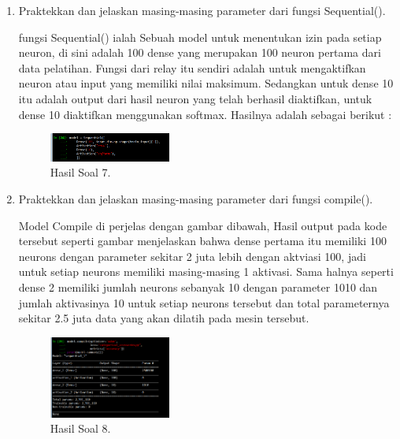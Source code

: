 \begin{enumerate}
	\item Praktekkan dan jelaskan masing-masing parameter dari fungsi Sequential().
	\hfill\break
	
	fungsi Sequential() ialah Sebuah model untuk menentukan izin pada setiap neuron, di sini adalah 100 dense yang merupakan 100 neuron pertama dari data pelatihan. Fungsi dari relay itu sendiri adalah untuk mengaktifkan neuron atau input yang memiliki nilai maksimum. Sedangkan untuk dense 10 itu adalah output dari hasil neuron yang telah berhasil diaktifkan, untuk dense 10 diaktifkan menggunakan softmax. Hasilnya adalah sebagai berikut :
	\begin{figure}[H]
	\centering
		\includegraphics[width=4cm]{figures/1174096/tugas6/hasil7.PNG}
		\caption{Hasil Soal 7.}
	\end{figure}

	\item Praktekkan dan jelaskan masing-masing parameter dari fungsi compile().
	\hfill\break
	
	Model Compile di perjelas dengan gambar dibawah, Hasil output pada kode tersebut seperti gambar  menjelaskan bahwa dense pertama itu memiliki 100 neurons dengan parameter sekitar 2 juta lebih dengan aktviasi 100, jadi untuk setiap neurons memiliki masing-masing 1 aktivasi. Sama halnya seperti dense 2 memiliki jumlah neurons sebanyak 10 dengan parameter 1010 dan jumlah aktivasinya 10 untuk setiap neurons tersebut dan total parameternya sekitar 2.5 juta data yang akan dilatih pada mesin tersebut.
	\begin{figure}[H]
	\centering
		\includegraphics[width=4cm]{figures/1174096/tugas6/hasil8.PNG}
		\caption{Hasil Soal 8.}
	\end{figure}


\end{enumerate}
